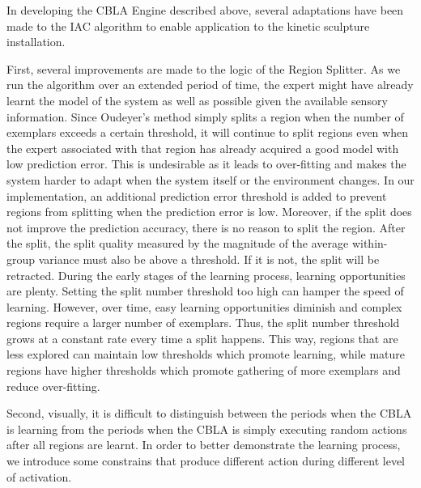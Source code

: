 In developing the CBLA Engine described above, several adaptations have been made to the IAC algorithm to enable application to the kinetic sculpture installation. 

First, several improvements are made to the logic of the Region Splitter. As we run the algorithm over an extended period of time, the expert might have already learnt the model of the system as well as possible given the available sensory information. Since Oudeyer's method simply splits a region when the number of exemplars exceeds a certain threshold, it will continue to split regions even when the expert associated with that region has already acquired a good model with low prediction error. This is undesirable as it leads to over-fitting and makes the system harder to adapt when the system itself or the environment changes. In our implementation, an additional prediction error threshold is added to prevent regions from splitting when the prediction error is low. Moreover, if the split does not improve the prediction accuracy, there is no reason to split the region. After the split, the split quality measured by the magnitude of the average within-group variance must also be above a threshold. If it is not, the split will be retracted. During the early stages of the learning process, learning opportunities are plenty. Setting the split number threshold too high can hamper the speed of learning. However, over time, easy learning opportunities diminish and complex regions require a larger number of exemplars. Thus, the split number threshold grows at a constant rate every time a split happens. This way, regions that are less explored can maintain low thresholds which promote learning, while mature regions have higher thresholds which promote gathering of more exemplars and reduce over-fitting.
 

Second, visually, it is difficult to distinguish between the periods when the CBLA is learning from the periods when the CBLA is simply executing random actions after all regions are learnt. In order to better demonstrate the learning process, we introduce some constrains that produce different action during different level of activation. 


